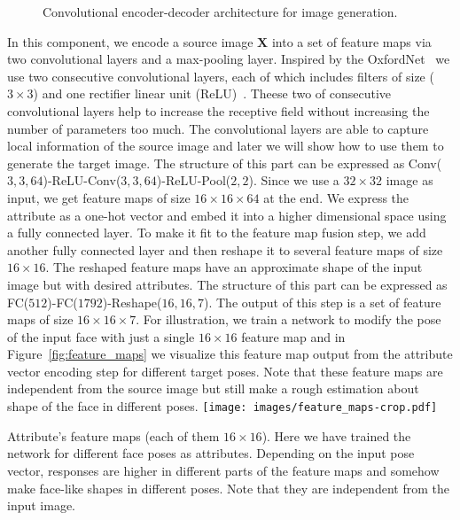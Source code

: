 \documentclass[10pt,twocolumn,letterpaper]{article}
\begin{document}
\begin{figure*}[t!]
\centering
{}
\caption{Convolutional encoder-decoder architecture for image generation.}
\label{fig:network_stage1}
\end{figure*}{}%
In this component, we encode a source image $\mathbf{X}$ into a set of feature maps via two convolutional layers and a max-pooling layer.
Inspired by the OxfordNet~\cite{Simonyan-iclr15}
we use two consecutive convolutional layers, each of which includes filters of size ($3\times3$) 
and one rectifier linear unit (ReLU)~\cite{Krizhevsky-nips12}.
Theese two of consecutive convolutional layers help to increase the receptive field without increasing the number of parameters too much.
The convolutional layers are able to capture local information of the source image 
and later we will show how to use them to generate the target image.
The structure of this part can be expressed as 
Conv($3,3,64$)-ReLU-Conv($3,3,64$)-ReLU-Pool($2,2$). %
Since we use a $32\times32$ image as input, we get feature maps of size $16\times16\times64$ at the end.
We express the attribute as a one-hot vector and embed it into a higher dimensional space using a fully connected layer.
To make it fit to the feature map fusion step, 
we add another fully connected layer and then reshape it to several feature maps of size $16\times16$.
The reshaped feature maps have an approximate shape of the input image but with desired attributes.
The structure of this part can be expressed as
FC($512$)-FC($1792$)-Reshape($16,16,7$).
The output of this step is a set of feature maps of size $16\times16\times7$.
For illustration, we train a network to modify the pose of the input face with just a single $16\times16$ feature map and in Figure~\ref{fig:feature_maps} we visualize this feature map output from the attribute vector encoding step for different target poses. Note that these feature maps are independent from the source image but still make a rough estimation about shape of the face in different poses.
\centering
\texttt{[image: images/feature\_maps-crop.pdf]} %
\caption{Attribute's feature maps (each of them $16\times16$). Here we have trained the network for different face poses as attributes. Depending on the input pose vector, responses are  higher in different parts of the feature maps and somehow make face-like shapes in different poses. Note that they are independent from the input image.}
\end{document}
